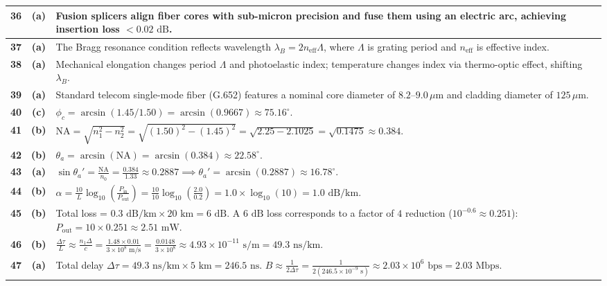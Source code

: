 {\begin{tabularx}{\textwidth}{|c|c|X|}
\textbf{36} & \textbf{(a)} & Fusion splicers align fiber cores with sub-micron precision and fuse them using an electric arc, achieving insertion loss $< 0.02\text{ dB}$. \\ \hline
\textbf{37} & \textbf{(a)} & The Bragg resonance condition reflects wavelength $\lambda_B = 2 n_{\text{eff}} \Lambda$, where $\Lambda$ is grating period and $n_{\text{eff}}$ is effective index. \\ \hline
\textbf{38} & \textbf{(a)} & Mechanical elongation changes period $\Lambda$ and photoelastic index; temperature changes index via thermo-optic effect, shifting $\lambda_B$. \\ \hline
\textbf{39} & \textbf{(a)} & Standard telecom single-mode fiber (G.652) features a nominal core diameter of $8.2\text{--}9.0\,\mu\text{m}$ and cladding diameter of $125\,\mu\text{m}$. \\ \hline
\textbf{40} & \textbf{(c)} & $\phi_c = \arcsin(1.45/1.50) = \arcsin(0.9667) \approx 75.16^\circ$. \\ \hline
\textbf{41} & \textbf{(b)} & $\text{NA} = \sqrt{n_1^2 - n_2^2} = \sqrt{(1.50)^2 - (1.45)^2} = \sqrt{2.25 - 2.1025} = \sqrt{0.1475} \approx 0.384$. \\ \hline
\textbf{42} & \textbf{(b)} & $\theta_a = \arcsin(\text{NA}) = \arcsin(0.384) \approx 22.58^\circ$. \\ \hline
\textbf{43} & \textbf{(a)} & $\sin\theta_a' = \frac{\text{NA}}{n_0} = \frac{0.384}{1.33} \approx 0.2887 \implies \theta_a' = \arcsin(0.2887) \approx 16.78^\circ$. \\ \hline
\textbf{44} & \textbf{(b)} & $\alpha = \frac{10}{L}\log_{10}\left(\frac{P_{\text{in}}}{P_{\text{out}}}\right) = \frac{10}{10}\log_{10}\left(\frac{2.0}{0.2}\right) = 1.0 \times \log_{10}(10) = 1.0\text{ dB/km}$. \\ \hline
\textbf{45} & \textbf{(b)} & Total loss = $0.3\text{ dB/km} \times 20\text{ km} = 6\text{ dB}$. A $6\text{ dB}$ loss corresponds to a factor of $4$ reduction ($10^{-0.6} \approx 0.251$): $P_{\text{out}} = 10 \times 0.251 \approx 2.51\text{ mW}$. \\ \hline
\textbf{46} & \textbf{(b)} & $\frac{\Delta\tau}{L} \approx \frac{n_1 \Delta}{c} = \frac{1.48 \times 0.01}{3 \times 10^8\text{ m/s}} = \frac{0.0148}{3 \times 10^8} \approx 4.93 \times 10^{-11}\text{ s/m} = 49.3\text{ ns/km}$. \\ \hline
\textbf{47} & \textbf{(a)} & Total delay $\Delta\tau = 49.3\text{ ns/km} \times 5\text{ km} = 246.5\text{ ns}$. $B \approx \frac{1}{2\Delta\tau} = \frac{1}{2(246.5 \times 10^{-9}\text{ s})} \approx 2.03 \times 10^6\text{ bps} = 2.03\text{ Mbps}$. \\ \hline

\end{tabularx}}
